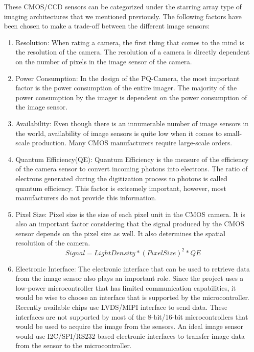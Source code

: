 These CMOS/CCD sensors can be categorized under the starring array type of imaging architectures that we mentioned previously. The following factors have been chosen to  make a trade-off between the different image sensors:
\begin{enumerate}
\item Resolution: When rating a camera, the first thing that comes to the mind is the resolution of the camera. The resolution of a camera is directly dependent on the number of pixels in the image sensor of the camera. 
\item Power Consumption: In the design of the PQ-Camera, the most important factor is the power consumption of the entire imager. The majority of the power consumption by the imager is dependent on the power consumption of the image sensor. 
\item Availability: Even though there is an innumerable number of image sensors in the world, availability of image sensors is quite low when it comes to small-scale production. Many CMOS manufacturers require large-scale orders.
\item Quantum Efficiency(QE): Quantum Efficiency is the measure of the efficiency of the camera sensor to convert incoming photons into electrons. The ratio of electrons generated during the digitization process to photons is called quantum efficiency. This factor is extremely important, however, most manufacturers do not provide this information.
\item Pixel Size: Pixel size is the size of each pixel unit in the CMOS camera. It is also an important factor considering that the signal produced by the CMOS sensor depends on the pixel size as well. It also determines the spatial resolution of the camera.
\begin{equation}
Signal = Light Density * (Pixel Size)^2 * QE
\end{equation}
\item Electronic Interface: The electronic interface that can be used to retrieve data from the image sensor also plays an important role. Since the project uses a low-power microcontroller that has limited communication capabilities, it would be wise to choose an interface that is supported by the microcontroller. Recently available chips use LVDS/MIPI interface to send data. These interfaces are not supported by most of the 8-bit/16-bit microcontrollers that would be used to acquire the image from the sensors. An ideal image sensor would use I2C/SPI/RS232 based electronic interfaces to transfer image data from the sensor to the microcontroller.


\end{enumerate}
